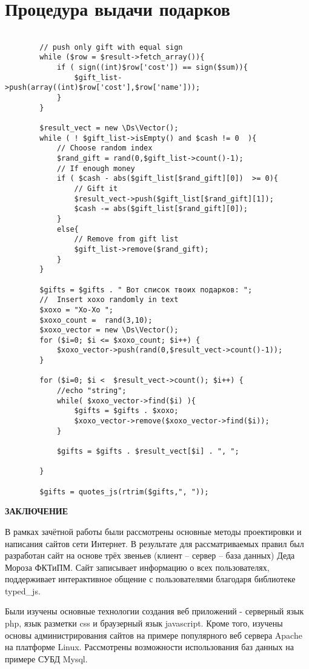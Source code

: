 \documentclass[oneside,final,14pt]{extreport}
\begin{document}
\section{Процедура выдачи подарков}
\begin{verbatim}

		// push only gift with equal sign
		while ($row = $result->fetch_array()){
			if ( sign((int)$row['cost']) == sign($sum)){
				$gift_list->push(array((int)$row['cost'],$row['name']));
			}
		}

		$result_vect = new \Ds\Vector();
		while ( ! $gift_list->isEmpty() and $cash != 0  ){
			// Choose random index
			$rand_gift = rand(0,$gift_list->count()-1);
			// If enough money
			if ( $cash - abs($gift_list[$rand_gift][0])  >= 0){
				// Gift it
				$result_vect->push($gift_list[$rand_gift][1]);
				$cash -= abs($gift_list[$rand_gift][0]);
			}
			else{
				// Remove from gift list
				$gift_list->remove($rand_gift);
			}
		}
		
		$gifts = $gifts . " Вот список твоих подарков: ";
		//  Insert xoxo randomly in text
		$xoxo = "Хо-Хо ";
		$xoxo_count =  rand(3,10);
		$xoxo_vector = new \Ds\Vector();
		for ($i=0; $i <= $xoxo_count; $i++) { 
			$xoxo_vector->push(rand(0,$result_vect->count()-1));
		}

		for ($i=0; $i <  $result_vect->count(); $i++) { 
			//echo "string";
			while( $xoxo_vector->find($i) ){
				$gifts = $gifts . $xoxo;
				$xoxo_vector->remove($xoxo_vector->find($i));
			}

			$gifts = $gifts . $result_vect[$i] . ", ";
			
		}

		$gifts = quotes_js(rtrim($gifts,", "));

\end{verbatim}
\newpage
\begin{center}
\bfseries ЗАКЛЮЧЕНИЕ
\end{center}

В рамках зачётной работы были рассмотрены основные методы проектировки и написания сайтов сети Интернет. В результате для рассматриваемых правил был разработан сайт на основе трёх звеньев (клиент – сервер – база данных) Деда Мороза ФКТиПМ. Сайт записывает информацию о всех пользователях, поддерживает интерактивное общение с пользователями благодаря библиотеке typed\_js.

Были изучены основные технологии создания веб приложений - серверный язык php, язык разметки css и браузерный язык javascript. Кроме того, изучены основы администрирования сайтов на примере популярного веб сервера Apache на платформе Linux. Рассмотрены возможности использования баз данных на примере СУБД Mysql.
\end{document}
